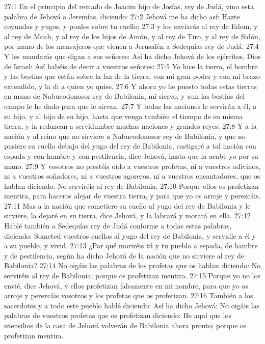 27:1 En el principio del reinado de Joacim hijo de Josías, rey de Judá, vino esta palabra de Jehová a Jeremías, diciendo: 
27:2 Jehová me ha dicho así: Hazte coyundas y yugos, y ponlos sobre tu cuello; 
27:3 y los enviarás al rey de Edom, y al rey de Moab, y al rey de los hijos de Amón, y al rey de Tiro, y al rey de Sidón, por mano de los mensajeros que vienen a Jerusalén a Sedequías rey de Judá. 
27:4 Y les mandarás que digan a sus señores: Así ha dicho Jehová de los ejércitos, Dios de Israel: Así habéis de decir a vuestros señores: 
27:5 Yo hice la tierra, el hombre y las bestias que están sobre la faz de la tierra, con mi gran poder y con mi brazo extendido, y la di a quien yo quise. 
27:6 Y ahora yo he puesto todas estas tierras en mano de Nabucodonosor rey de Babilonia, mi siervo, y aun las bestias del campo le he dado para que le sirvan. 
27:7 Y todas las naciones le servirán a él, a su hijo, y al hijo de su hijo, hasta que venga también el tiempo de su misma tierra, y la reduzcan a servidumbre muchas naciones y grandes reyes. 
27:8 Y a la nación y al reino que no sirviere a Nabucodonosor rey de Babilonia, y que no pusiere su cuello debajo del yugo del rey de Babilonia, castigaré a tal nación con espada y con hambre y con pestilencia, dice Jehová, hasta que la acabe yo por su mano. 
27:9 Y vosotros no prestéis oído a vuestros profetas, ni a vuestros adivinos, ni a vuestros soñadores, ni a vuestros agoreros, ni a vuestros encantadores, que os hablan diciendo: No serviréis al rey de Babilonia. 
27:10 Porque ellos os profetizan mentira, para haceros alejar de vuestra tierra, y para que yo os arroje y perezcáis. 
27:11 Mas a la nación que sometiere su cuello al yugo del rey de Babilonia y le sirviere, la dejaré en su tierra, dice Jehová, y la labrará y morará en ella. 
27:12 Hablé también a Sedequías rey de Judá conforme a todas estas palabras, diciendo: Someted vuestros cuellos al yugo del rey de Babilonia, y servidle a él y a su pueblo, y vivid. 
27:13 ¿Por qué moriréis tú y tu pueblo a espada, de hambre y de pestilencia, según ha dicho Jehová de la nación que no sirviere al rey de Babilonia? 
27:14 No oigáis las palabras de los profetas que os hablan diciendo: No serviréis al rey de Babilonia; porque os profetizan mentira. 
27:15 Porque yo no los envié, dice Jehová, y ellos profetizan falsamente en mi nombre, para que yo os arroje y perezcáis vosotros y los profetas que os profetizan. 
27:16 También a los sacerdotes y a todo este pueblo hablé diciendo: Así ha dicho Jehová: No oigáis las palabras de vuestros profetas que os profetizan diciendo: He aquí que los utensilios de la casa de Jehová volverán de Babilonia ahora pronto; porque os profetizan mentira. 

